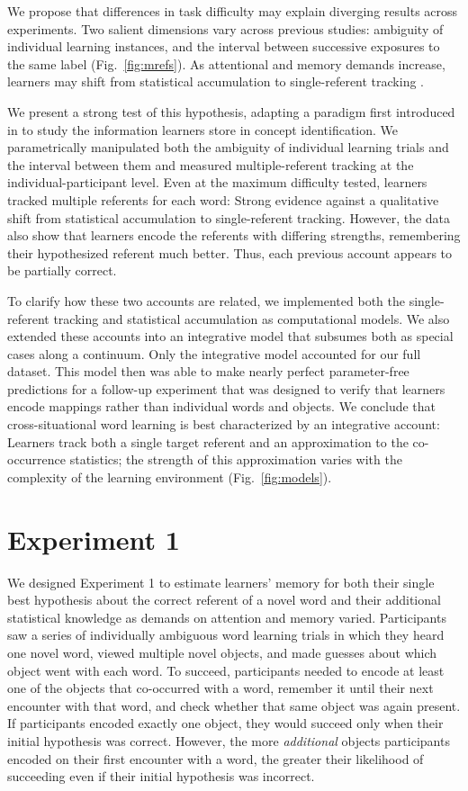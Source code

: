 \documentclass{pnastwo}
\begin{document}
\begin{article}
We propose that differences in task difficulty may explain diverging results across experiments. Two salient dimensions vary across previous studies: ambiguity of individual learning instances, and the interval between successive exposures to the same label (Fig.~\ref{fig:mrefs}). As attentional and memory demands increase, learners may shift from statistical accumulation to single-referent tracking \citep{Smith2011a, Trueswell2013}. 

We present a strong test of this hypothesis, adapting a paradigm first introduced in \citep{Bower1963} to study the information learners store in concept identification. We parametrically manipulated both the ambiguity of individual learning trials and the interval between them and measured multiple-referent tracking at the individual-participant level. Even at the maximum difficulty tested, learners tracked multiple referents for each word: Strong evidence against a qualitative shift from statistical accumulation to single-referent tracking. However, the data also show that learners encode the referents with differing strengths, remembering their hypothesized referent much better. Thus, each previous account appears to be partially correct. 

To clarify how these two accounts are related, we implemented both the single-referent tracking and statistical accumulation as computational models. We also extended these accounts into an integrative model that subsumes both as special cases along a continuum. Only the integrative model accounted for our full dataset. This model then was able to make nearly perfect parameter-free predictions for a follow-up experiment that was designed to verify that learners encode mappings rather than individual words and objects. We conclude that cross-situational word learning is best characterized by an integrative account: Learners track both a single target referent and an approximation to the co-occurrence statistics; the strength of this approximation varies with the complexity of the learning environment (Fig.~\ref{fig:models}).

\section{Experiment 1}

We designed Experiment 1 to estimate learners' memory for both their single best hypothesis about the correct referent of a novel word and their additional statistical knowledge as demands on attention and memory varied. Participants saw a series of individually ambiguous word learning trials in which they heard one novel word, viewed multiple novel objects, and made guesses about which object went with each word. To succeed, participants needed to encode at least one of the objects that co-occurred with a word, remember it until their next encounter with that word, and check whether that same object was again present. If participants encoded exactly one object, they would succeed only when their initial hypothesis was correct. However, the more \emph{additional} objects participants encoded on their first encounter with a word, the greater their likelihood of succeeding even if their initial hypothesis was incorrect. 


\end{article}
\end{document}
